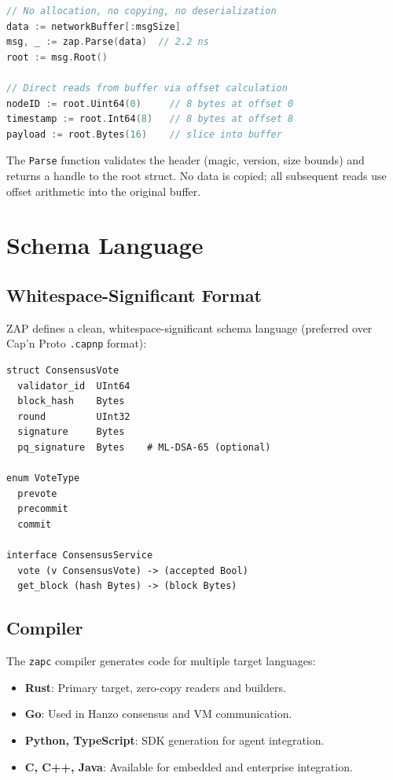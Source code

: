 \documentclass[11pt,letterpaper]{article}
\begin{document}
\begin{lstlisting}[language=Go,caption={Zero-copy message access (Go implementation).}]
// No allocation, no copying, no deserialization
data := networkBuffer[:msgSize]
msg, _ := zap.Parse(data)  // 2.2 ns
root := msg.Root()

// Direct reads from buffer via offset calculation
nodeID := root.Uint64(0)     // 8 bytes at offset 0
timestamp := root.Int64(8)   // 8 bytes at offset 8
payload := root.Bytes(16)    // slice into buffer
\end{lstlisting}

The \texttt{Parse} function validates the header (magic, version, size bounds) and returns a handle to the root struct. No data is copied; all subsequent reads use offset arithmetic into the original buffer.

\section{Schema Language}

\subsection{Whitespace-Significant Format}

ZAP defines a clean, whitespace-significant schema language (preferred over Cap'n Proto \texttt{.capnp} format):

\begin{lstlisting}[caption={ZAP schema definition.}]
struct ConsensusVote
  validator_id  UInt64
  block_hash    Bytes
  round         UInt32
  signature     Bytes
  pq_signature  Bytes    # ML-DSA-65 (optional)

enum VoteType
  prevote
  precommit
  commit

interface ConsensusService
  vote (v ConsensusVote) -> (accepted Bool)
  get_block (hash Bytes) -> (block Bytes)
\end{lstlisting}

\subsection{Compiler}

The \texttt{zapc} compiler generates code for multiple target languages:

\begin{itemize}
\item \textbf{Rust}: Primary target, zero-copy readers and builders.
\item \textbf{Go}: Used in Hanzo consensus and VM communication.
\item \textbf{Python, TypeScript}: SDK generation for agent integration.
\item \textbf{C, C++, Java}: Available for embedded and enterprise integration.
\end{itemize}
\end{document}
